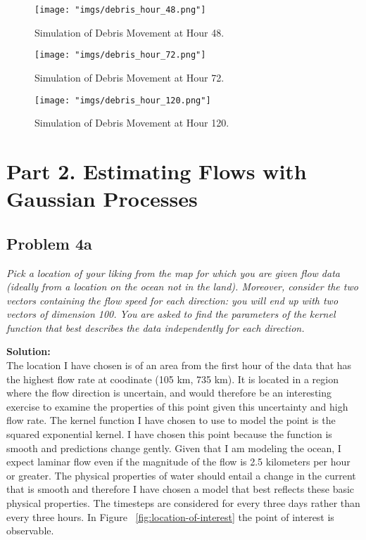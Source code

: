 \documentclass[11pt]{article}
\newcommand{\question}[1]{\textit{#1}}
\begin{document}
\begin{figure}[htbp]
    \centering
    \texttt{[image: "imgs/debris\_hour\_48.png"]} %
    \caption{Simulation of Debris Movement at Hour 48.}
    \label{fig:debris-hour-48}
\end{figure}
\FloatBarrier

\begin{figure}[htbp]
    \centering
    \texttt{[image: "imgs/debris\_hour\_72.png"]} %
    \caption{Simulation of Debris Movement at Hour 72.}
    \label{fig:debris-hour-72}
\end{figure}
\FloatBarrier

\begin{figure}[htbp]
    \centering
    \texttt{[image: "imgs/debris\_hour\_120.png"]} %
    \caption{Simulation of Debris Movement at Hour 120.}
    \label{fig:debris-hour-120}
\end{figure}
\FloatBarrier

\section{Part 2. Estimating Flows with Gaussian Processes}

\subsection{Problem 4a}

\question{Pick a location of your liking from the map for which you are given flow data (ideally from a location on the ocean not in the land). Moreover, consider the two vectors containing the flow speed for each direction: you will end up with two vectors of dimension 100. You are asked to find the parameters of the kernel function that best describes the data independently for each direction.
}

\textbf{Solution:} \\

The location I have chosen is of an area from the first hour of the data that has the highest flow rate at coodinate (105 km, 735 km). 
It is located in a region where the flow direction is uncertain, and would therefore be an interesting exercise to examine the properties of this point given this uncertainty and high flow rate. The kernel function I have chosen to use to model the point is the squared exponential kernel. I have chosen this point because the function is smooth and predictions change gently. Given that I am modeling the ocean, I expect laminar flow even if the magnitude of the flow is 2.5 kilometers per hour or greater. The physical properties of water should entail a change in the current that is smooth and therefore I have chosen a model that best reflects these basic physical properties. The timesteps are considered for every three days rather than every three hours. In Figure ~\ref{fig:location-of-interest} the point of interest is observable.
\end{document}
